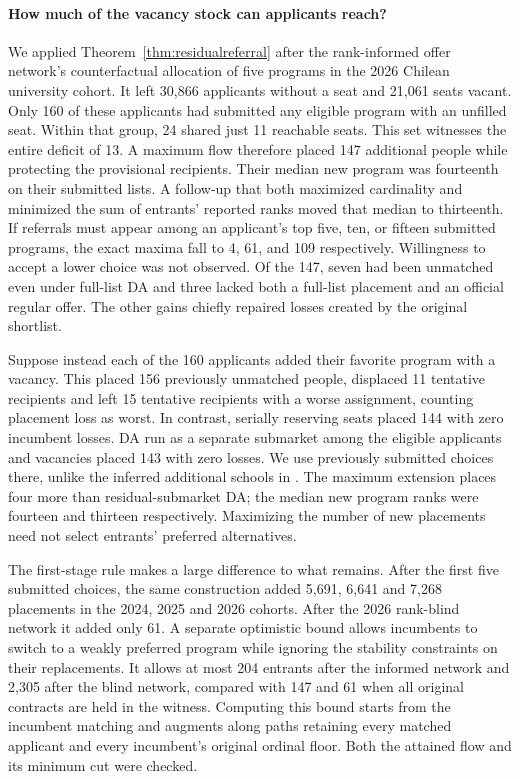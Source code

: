 \paragraph{How much of the vacancy stock can applicants reach?}
We applied Theorem~\ref{thm:residualreferral} after the rank-informed offer network's counterfactual allocation of five programs in the 2026 Chilean university cohort. It left 30,866 applicants without a seat and 21,061 seats vacant. Only 160 of these applicants had submitted any eligible program with an unfilled seat. Within that group, 24 shared just 11 reachable seats. This set witnesses the entire deficit of 13. A maximum flow therefore placed 147 additional people while protecting the provisional recipients. Their median new program was fourteenth on their submitted lists. A follow-up that both maximized cardinality and minimized the sum of entrants' reported ranks moved that median to thirteenth. If referrals must appear among an applicant's top five, ten, or fifteen submitted programs, the exact maxima fall to 4, 61, and 109 respectively. Willingness to accept a lower choice was not observed. Of the 147, seven had been unmatched even under full-list DA and three lacked both a full-list placement and an official regular offer. The other gains chiefly repaired losses created by the original shortlist.

Suppose instead each of the 160 applicants added their favorite program with a vacancy. This placed 156 previously unmatched people, displaced 11 tentative recipients and left 15 tentative recipients with a worse assignment, counting placement loss as worst. In contrast, serially reserving seats placed 144 with zero incumbent losses. DA run as a separate submarket among the eligible applicants and vacancies placed 143 with zero losses. We use previously submitted choices there, unlike the inferred additional schools in \citet{lepesure}. The maximum extension places four more than residual-submarket DA; the median new program ranks were fourteen and thirteen respectively. Maximizing the number of new placements need not select entrants' preferred alternatives.

The first-stage rule makes a large difference to what remains. After the first five submitted choices, the same construction added 5,691, 6,641 and 7,268 placements in the 2024, 2025 and 2026 cohorts. After the 2026 rank-blind network it added only 61. A separate optimistic bound allows incumbents to switch to a weakly preferred program while ignoring the stability constraints on their replacements. It allows at most 204 entrants after the informed network and 2,305 after the blind network, compared with 147 and 61 when all original contracts are held in the witness. Computing this bound starts from the incumbent matching and augments along paths retaining every matched applicant and every incumbent's original ordinal floor. Both the attained flow and its minimum cut were checked.

